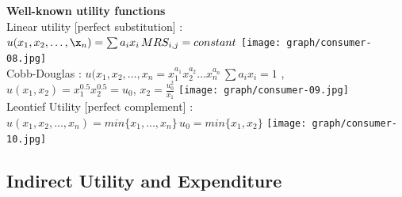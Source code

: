 \documentclass[letterpaper,13pt,single,pdftex]{scrartcl}
\begin{document}
\textbf{Well-known utility functions}\\
Linear utility [perfect substitution] : $u(x_1,x_2,\dots,\x_n) = \sum{a_ix_i} \,MRS_{i,j} = constant$
\texttt{[image: graph/consumer-08.jpg]}
 \\Cobb-Douglas
 :  $u(x_1,x_2,\dots,x_n = x_1^{a_1} x_2^{a_2}\dots x_n^{a_n}\, \sum{a_ix_i} = 1$ ,$ u(x_1,x_2) = x^{0.5}_1x^{0.5}_2 = u_0$, $x_2 = \frac{u_0^2}{x_1}$
\texttt{[image: graph/consumer-09.jpg]}
 \\Leontief Utility [perfect complement] : $u(x_1,x_2,\dots,x_n) = min \{x_1,\dots,x_n\}\, u_0 = min\{x_1,x_2\}$
\texttt{[image: graph/consumer-10.jpg]}

\subsection{Indirect Utility and Expenditure}
\end{document}
